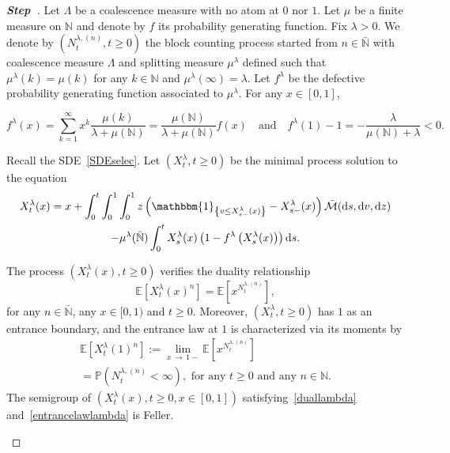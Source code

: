 \documentclass[AHL,Unicode,longabstracts,published]{cedram}
\newcommand{\ddr}{\mathrm{d}}
\newcommand{\bbmun}{\mathbbm{1}}
\newcommand{\bbN}{\mathbb{N}}
\newcommand{\bbE}{\mathbb{E}}
\newcommand{\bbP}{\mathbb{P}}
\newcommand{\clM}{\mathcal{M}}
\newcounter{stepcount}
\newenvironment{step}{\refstepcounter{stepcount}\begin{proof}[\textbf{Step~\thestepcount}]}{\end{proof}}
\begin{document}
\begin{step}%
Let $\Lambda$ be a coalescence measure with no atom at $0$ nor $1$. Let $\mu$ be a finite measure on $\bbN$ and denote by $f$ its probability generating function. Fix $\lambda>0$. We denote by $(N_t^{\lambda,(n)},t\geq 0)$ the block counting process started from $n\in \bar{\bbN}$ with coalescence measure $\Lambda$ and splitting measure $\mu^{\lambda}$ defined such that $\mu^{\lambda}(k)=\mu(k)$ for any $k\in \bbN$ and $\mu^{\lambda}(\infty)=\lambda$. Let $f^{\lambda}$ be the defective probability generating function associated to $\mu^{\lambda}$. For any $x\in [0,1]$, 

\[
f^{\lambda}(x)=\sum_{k=1}^{\infty}x^{k}\frac{\mu(k)}{\lambda+\mu(\bbN)}=\frac{\mu(\bbN)}{\lambda+\mu(\bbN)}f(x)\quad\text{and}\quad f^{\lambda}(1)-1=-\frac{\lambda}{\mu(\bbN)+\lambda}<0.
\]

Recall the SDE~\eqref{SDEselec}. Let $(X^{\lambda}_t,t\geq 0)$ be the minimal process solution to the equation
\begin{multline}\label{sdelambda}
X^{\lambda}_t(x)=x+\int_{0}^{t}\int_{0}^{1}\int_{0}^{1}z\left(\bbmun_{\left\{v\leq X^{\lambda}_{s-}(x)\right\}}-X^{\lambda}_{s-}(x)\right)\bar{\clM}(\ddr s,\ddr v, \ddr z)\\
-\mu^{\lambda}(\bar{\bbN})\int_{0}^{t}X^{\lambda}_{s}(x)\left(1-f^{\lambda}\left(X^{\lambda}_{s}(x)\right)\right)\ddr s.
\end{multline}

\begin{lemm}\label{recextenslambda}
The process $(X_t^{\lambda}(x),t\geq 0)$ verifies the duality relationship
\begin{equation}\label{duallambda}
\bbE\left[X^{\lambda}_t(x)^n\right]=\bbE\left[x^{N_t^{\lambda,(n)}}\right],
\end{equation}
for any $n\in \bar{\bbN}$, any $x\in [0,1)$ and $t\geq 0$. Moreover, $(X_t^{\lambda},t\geq 0)$ has $1$ as an entrance boundary, and the entrance law at $1$ is characterized via its moments by
\begin{multline}\label{entrancelawlambda}
\bbE\left[X^{\lambda}_t(1)^n\right]:=\underset{x\,\rightarrow\,1-}{\lim} \bbE\left[x^{N_t^{\lambda,(n)}}\right]\\
=\bbP\left(N_t^{\lambda,(n)}<\infty\right),\text{ for any } t\geq 0 \text{ and any } n\in \bbN.
\end{multline}
The semigroup of $(X_t^{\lambda}(x),t\geq 0, x\in [0,1])$ satisfying~\eqref{duallambda} and~\eqref{entrancelawlambda} is Feller.
\end{lemm}


\end{step}
\end{document}
